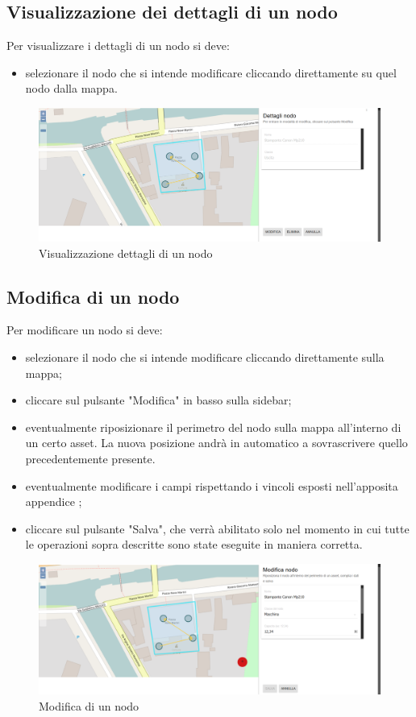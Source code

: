 \subsection{Visualizzazione dei dettagli di un nodo}
Per visualizzare i dettagli di un nodo si deve:
\begin{itemize}
	\item selezionare il  nodo che si intende modificare cliccando direttamente su quel nodo dalla mappa.
\end{itemize}

\begin{figure}[H]
\centering
\includegraphics[width=\textwidth]{img/visualizzazione_nodo.png}
\caption{Visualizzazione dettagli di un nodo}
\end{figure}

\subsection{Modifica di un nodo}
Per modificare un nodo si deve:
\begin{itemize}
	\item selezionare il nodo che si intende modificare cliccando direttamente sulla mappa;
	\item cliccare sul pulsante "Modifica" in basso sulla sidebar;
	\item eventualmente riposizionare il perimetro del nodo sulla mappa all'interno di un certo asset. La nuova posizione andrà in automatico a sovrascrivere quello precedentemente presente.
	\item eventualmente modificare i campi rispettando i vincoli esposti nell'apposita appendice ;
	\item cliccare sul pulsante "Salva", che verrà abilitato solo nel momento in cui tutte le operazioni sopra descritte sono state eseguite in maniera corretta.
\end{itemize}

\begin{figure}[H]
\centering
\includegraphics[width=\textwidth]{img/modifica_nodo.png}
\caption{Modifica di un nodo}
\end{figure}

